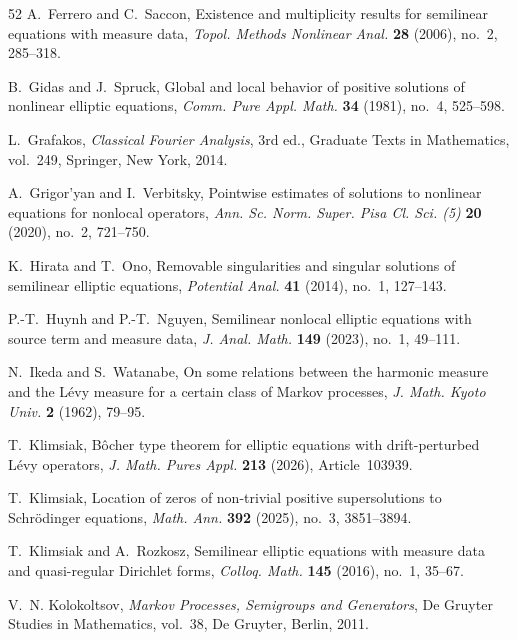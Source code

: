 \documentclass[11pt,a4paper,reqno]{amsart}
\theoremstyle{definition}
\numberwithin{equation}{section}
\begin{document}
\begin{thebibliography}{52}
A.~Ferrero and C.~Saccon,
Existence and multiplicity results for semilinear equations with measure data,
\emph{Topol. Methods Nonlinear Anal.} \textbf{28} (2006), no.~2, 285--318.

B.~Gidas and J.~Spruck,
Global and local behavior of positive solutions of nonlinear elliptic equations,
\emph{Comm. Pure Appl. Math.} \textbf{34} (1981), no.~4, 525--598.

L.~Grafakos,
\emph{Classical Fourier Analysis},
3rd ed., Graduate Texts in Mathematics, vol.~249,
Springer, New York, 2014.

A.~Grigor'yan and I.~Verbitsky,
Pointwise estimates of solutions to nonlinear equations for nonlocal operators,
\emph{Ann. Sc. Norm. Super. Pisa Cl. Sci. (5)} \textbf{20} (2020), no.~2, 721--750.



K.~Hirata and T.~Ono,
Removable singularities and singular solutions of semilinear elliptic equations,
\emph{Potential Anal.} \textbf{41} (2014), no.~1, 127--143.

P.-T.~Huynh and P.-T.~Nguyen,
Semilinear nonlocal elliptic equations with source term and measure data,
\emph{J. Anal. Math.} \textbf{149} (2023), no.~1, 49--111.

N.~Ikeda and S.~Watanabe,
On some relations between the harmonic measure and the L\'evy measure for a certain class of Markov processes,
\emph{J. Math. Kyoto Univ.} \textbf{2} (1962), 79--95.

T.~Klimsiak,
B\^ocher type theorem for elliptic equations with drift-perturbed
L\'evy operators,
\emph{J. Math. Pures Appl.} \textbf{213} (2026), Article~103939.



T.~Klimsiak,
Location of zeros of non-trivial positive supersolutions to Schr\"odinger equations,
\emph{Math. Ann.} \textbf{392} (2025), no.~3, 3851--3894.

T.~Klimsiak and A.~Rozkosz,
Semilinear elliptic equations with measure data and quasi-regular Dirichlet forms,
\emph{Colloq. Math.} \textbf{145} (2016), no.~1, 35--67.

V.~N. Kolokoltsov,
\emph{Markov Processes, Semigroups and Generators},
De Gruyter Studies in Mathematics, vol.~38,
De Gruyter, Berlin, 2011.


\end{thebibliography}
\end{document}
